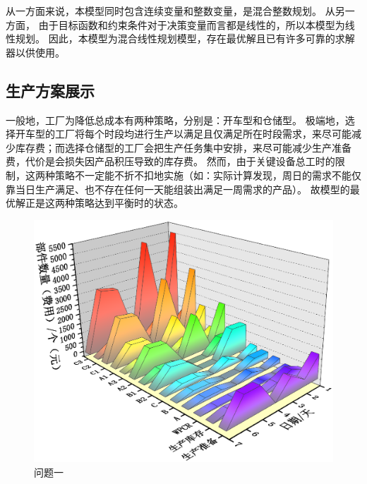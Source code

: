 从一方面来说，本模型同时包含连续变量和整数变量，是混合整数规划。
从另一方面， 由于目标函数和约束条件对于决策变量而言都是线性的，所以本模型为线性规划。
因此，本模型为混合线性规划模型，存在最优解且已有许多可靠的求解器以供使用。

\subsection{生产方案展示} %
\label{sub:生产方案展示}

一般地，工厂为降低总成本有两种策略，分别是：开车型和仓储型。
极端地，选择开车型的工厂将每个时段均进行生产以满足且仅满足所在时段需求，来尽可能减少库存费；而选择仓储型的工厂会把生产任务集中安排，来尽可能减少生产准备费，代价是会损失因产品积压导致的库存费。
然而，由于关键设备总工时的限制，这两种策略不一定能不折不扣地实施（如：实际计算发现，周日的需求不能仅靠当日生产满足、也不存在任何一天能组装出满足一周需求的产品）。
故模型的最优解正是这两种策略达到平衡时的状态。

\begin{figure}[!htbp]
	\centering
	\includegraphics{Image/问题一展示.eps}
	\caption{问题一}\label{问题一}
\end{figure}



